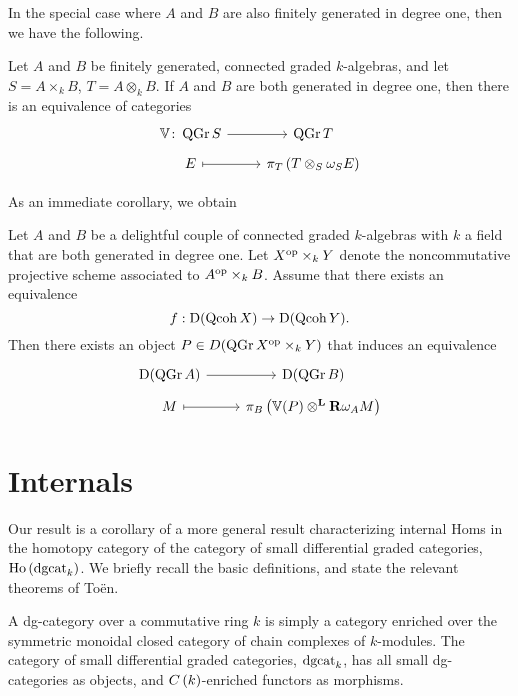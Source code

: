 \documentclass[reqno, 12pt]{amsart}
\begin{document}
In the special case where \(A\) and \(B\) are also finitely generated in degree one, then we have the following.

\begin{theorem}[{\cite[Theorem 2.4]{VR96}}]\label{theorem: Van Rompay}
    Let \(A\) and \(B\) be finitely generated, connected graded \(k\)-algebras, and let \(S = A \times_k B\), \(T = A \otimes_k B\).
    If \(A\) and \(B\) are both generated in degree one, then there is an equivalence of categories
    \[\begin{tikzcd}[row sep=tiny]
    \mathbb{V} \colon \QGr{S} \arrow{r} & \QGr{T}\\
    E \arrow[mapsto]{r} & \pi_{T}\left(T \otimes_S \omega_{S}E\right)
    \end{tikzcd}\]
\end{theorem}

As an immediate corollary, we obtain

\begin{corollary} \label{corollary: NCP morita degree 1}
  Let \(A\) and \(B\) be a delightful couple of connected graded \(k\)-algebras with \(k\) a field that are both generated in degree one.
  Let \(X^{\operatorname{op}} \times_k Y\) denote the noncommutative projective scheme associated to \(A^{\operatorname{op}} \times_k B\).
  Assume that there exists an equivalence
  \begin{displaymath}
    f : \mathrm{D} (\operatorname{Qcoh}X) \to \mathrm{D} (\operatorname{Qcoh}Y).
  \end{displaymath}
  Then there exists an object \(P \in D ( \operatorname{QGr}X^{\operatorname{op}} \times_k Y )\) that induces an equivalence
  \[\begin{tikzcd}[row sep=tiny]
  \mathrm{D}(\QGr{A}) \arrow{r}& \mathrm{D}(\QGr{B})\\
  M \arrow[mapsto]{r} & \pi_B\left(\mathbb{V}(P) \otimes^\mathbf{L} \mathbf{R}\omega_A M\right)
  \end{tikzcd}\]
\end{corollary}

\section{Internals}

Our result is a corollary of a more general result characterizing internal Homs in the homotopy category of the category of small differential graded categories,
$\operatorname{Ho}\left(\operatorname{dgcat}_k\right)$.
We briefly recall the basic definitions, and state the relevant theorems of To\"en.

A dg-category over a commutative ring $k$ is simply a category enriched over the symmetric monoidal closed category of chain complexes of $k$-modules.
The category of small differential graded categories, $\operatorname{dgcat}_k$, has all small dg-categories as objects, and $C\left(k\right)$-enriched functors as morphisms.
\end{document}
